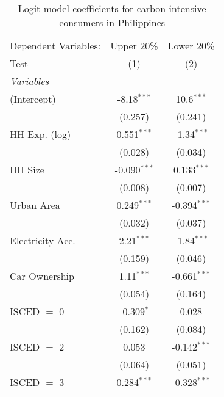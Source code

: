 
\begin{table}[htbp!]
   \centering
   \small
   \begin{adjustbox}{width = 1\textwidth, max height = 0.95\textheight, center}
      \begin{threeparttable}[b]
         \caption{\label{tab:Logit_1_PHL} Logit-model coefficients for carbon-intensive consumers in Philippines}
         \begin{tabular}{lcc}
            \tabularnewline \midrule \midrule
            Dependent Variables: & Upper 20\%     & Lower 20\%\\   
            Test                 & (1)            & (2)\\  
            \midrule
            \emph{Variables}\\
            (Intercept)          & -8.18$^{***}$  & 10.6$^{***}$\\   
                                 & (0.257)        & (0.241)\\   
            HH Exp. (log)        & 0.551$^{***}$  & -1.34$^{***}$\\   
                                 & (0.028)        & (0.034)\\   
            HH Size              & -0.090$^{***}$ & 0.133$^{***}$\\   
                                 & (0.008)        & (0.007)\\   
            Urban Area           & 0.249$^{***}$  & -0.394$^{***}$\\   
                                 & (0.032)        & (0.037)\\   
            Electricity Acc.     & 2.21$^{***}$   & -1.84$^{***}$\\   
                                 & (0.159)        & (0.046)\\   
            Car Ownership        & 1.11$^{***}$   & -0.661$^{***}$\\   
                                 & (0.054)        & (0.164)\\   
            ISCED $=$ 0          & -0.309$^{*}$   & 0.028\\   
                                 & (0.162)        & (0.084)\\   
            ISCED $=$ 2          & 0.053          & -0.142$^{***}$\\   
                                 & (0.064)        & (0.051)\\   
            ISCED $=$ 3          & 0.284$^{***}$  & -0.328$^{***}$\\   

\end{tabular}
\end{threeparttable}
\end{adjustbox}
\end{table}
